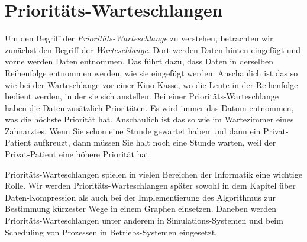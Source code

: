 \chapter{Priorit\"ats-Warteschlangen \label{chap:prioqueue}}
Um den Begriff der  \emph{Priorit\"ats-Warteschlange} zu verstehen, betrachten wir zun\"achst
den Begriff der \emph{Warteschlange}.  Dort werden Daten hinten eingef\"ugt und vorne werden
Daten entnommen. Das f\"uhrt dazu, dass Daten in derselben Reihenfolge entnommen werden,
wie sie eingef\"ugt werden.  Anschaulich ist das so wie bei der Warteschlange vor einer
Kino-Kasse, wo die Leute in der Reihenfolge bedient werden, in der sie sich anstellen.
Bei einer Priorit\"ats-Warteschlange haben die Daten zus\"atzlich Priorit\"aten.  Es wird immer
das Datum entnommen, was die h\"ochste Priorit\"at hat.  Anschaulich ist das so wie im
Wartezimmer eines Zahnarztes. Wenn Sie schon eine Stunde gewartet haben und dann ein
Privat-Patient aufkreuzt, dann m\"ussen Sie halt noch eine Stunde warten, weil der
Privat-Patient eine h\"ohere Priorit\"at hat.

Priorit\"ats-Warteschlangen spielen in vielen Bereichen der Informatik  eine wichtige
Rolle.  Wir werden Priorit\"ats-Warteschlangen sp\"ater sowohl in dem Kapitel \"uber
Daten-Kompression als auch bei der Implementierung des Algorithmus zur Bestimmung
k\"urzester Wege in einem Graphen einsetzen.  Daneben werden Priorit\"ats-Warteschlangen unter anderem in
Simulations-Systemen und beim Scheduling von Prozessen in Betriebs-Systemen eingesetzt.


